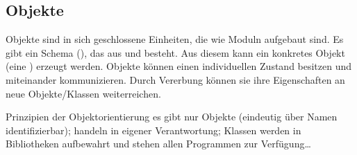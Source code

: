 \subsection{%
    Objekte%
}

\begin{Def}{Objekte}
     sind in sich geschlossene Einheiten, die wie Moduln
    aufgebaut sind.
    Es gibt ein Schema (), das aus  und
     besteht.
    Aus diesem kann ein konkretes Objekt (eine ) erzeugt
    werden.
    Objekte können einen individuellen Zustand besitzen und miteinander
    kommunizieren.
    Durch Vererbung können sie ihre Eigenschaften an neue Objekte/Klassen
    weiterreichen.
\end{Def}

\begin{Def}{Prinzipien der Objektorientierung}
    es gibt nur Objekte (eindeutig über Namen identifizierbar);
    handeln in eigener Verantwortung;
    Klassen werden in Bibliotheken aufbewahrt und stehen allen
    Programmen zur Verfügung\dots
\end{Def}

\pagebreak
